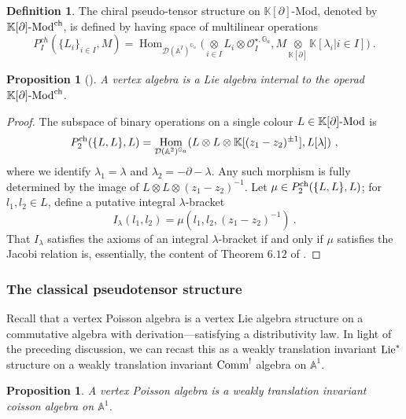\documentclass[11pt]{amsart}
\numberwithin{equation}{section}
\newtheorem{prop}[theo]{Proposition}
\theoremstyle{definition}
\newtheorem{defn}[theo]{Definition}
\newcommand{\bb}{\mathbb}
\newcommand{\mc}{\mathcal}
\DeclareMathOperator{\Hom}{Hom}
\newcommand{\Mod}{{\textup{-Mod}}}
\newcommand{\ik}{{\bb K}}
\newcommand{\Comm}{{\textup{Comm}}}
\newcommand{\Lie}{{\textup{Lie}}}
\newcommand{\ch}{{\textup{ch}}}
\newcommand{\0}{{\textbf{0}}}
\newcommand{\del}{{{\partial}}}
\def\IA{\mathbb{A}}
\def\IG{\mathbb{G}}
\def\OO{{\mc O}}
\def\ch{{\rm ch}}
\newcommand{\tensor}[1]{\underset{#1}{\otimes}}
\begin{document}
\begin{defn}
	The chiral pseudo-tensor structure on $\ik[\partial]$-Mod, denoted by $\ik[\partial]\textup{-Mod}^\ch$, is defined by having space of multilinear operations
	\[
	P^{ch}_I(\{L_i\}_{i\in I}, M) = \Hom_{{\mc D}(\IA^I)^{\IG_a}}\big(\tensor{i\in I} L_i\otimes \OO_I^{\star,\IG_a}, M\tensor{\ik[\partial]}\ik[\lambda_i|i\in I]\big)~.
	\]
\end{defn}

\begin{prop}[\cite{BD1,BDSHK19}]
	A vertex algebra is a Lie algebra internal to the operad $\ik[\partial]\textup{-Mod}^{\rm ch}$.
\end{prop}
\begin{proof}
	The subspace of binary operations on a single colour $L\in\ik[\del]\Mod$ is 
	\[
	P^{\ch}_2(\{L,L\},L) = \Hom_{\mc{D}(\IA^2)^{\IG_a}}(L\otimes L \otimes \ik[(z_1-z_2)^{\pm1}],L[\lambda])~,
	\]
	where we identify $\lambda_1=\lambda$ and $\lambda_2 = - \partial-\lambda$. Any such morphism is fully determined by the image of $L\otimes L \otimes (z_1-z_2)^{-1}$. Let $\mu\in P_2^{\ch}(\{L,L\},L)$; for $l_1,l_2\in L$, define a putative integral $\lambda$-bracket
	\[
	I_\lambda(l_1,l_2) = \mu(l_1,l_2,(z_1-z_2)^{-1})~.
	\]
	That $I_\lambda$ satisfies the axioms of an integral $\lambda$-bracket if and only if $\mu$ satisfies the Jacobi relation is, essentially, the content of Theorem $6.12$ of \cite{BDSHK19}.
\end{proof}

\subsubsection{The classical pseudotensor structure}
Recall that a vertex Poisson algebra is a vertex Lie algebra structure on a commutative algebra with derivation---satisfying a distributivity law. In light of the preceding discussion, we can recast this as a weakly translation invariant $\Lie^*$ structure on a weakly translation invariant $\Comm^!$ algebra on $\IA^1$.

\begin{prop}
	A vertex Poisson algebra is a weakly translation invariant coisson algebra on $\IA^1$.
\end{prop}
\end{document}
